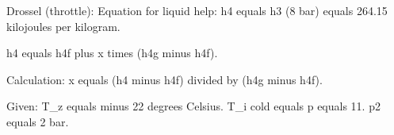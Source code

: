 Drossel (throttle):  
Equation for liquid help:  
h4 equals h3 (8 bar) equals 264.15 kilojoules per kilogram.  

h4 equals h4f plus x times (h4g minus h4f).  

Calculation:  
x equals (h4 minus h4f) divided by (h4g minus h4f).  

Given:  
T_z equals minus 22 degrees Celsius.  
T_i cold equals p equals 11.  
p2 equals 2 bar.